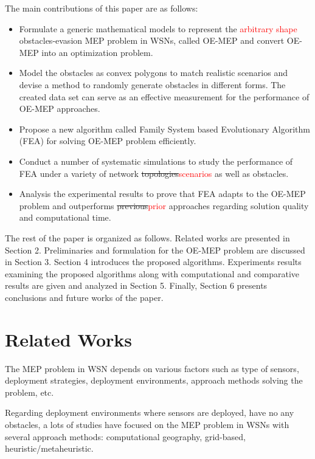\documentclass[final]{elsarticle}
\begin{document}
The main contributions of this paper are as follows:
\begin{itemize}
	\itemsep0em
	\item Formulate a generic mathematical models to represent the \textcolor{red}{arbitrary shape} obstacles-evasion MEP problem in WSNs, called OE-MEP and convert OE-MEP into an optimization problem.
	\item Model the obstacles as convex polygons to match realistic scenarios and devise a method to randomly generate obstacles in different forms. The created data set can serve as an effective measurement for the performance of OE-MEP approaches.  
	\item Propose a new algorithm called Family System based Evolutionary Algorithm (FEA) for solving OE-MEP problem efficiently. 
	\item Conduct a number of systematic simulations to study the performance of FEA under a variety of network \sout{topologies}\textcolor{red}{scenarios} as well as obstacles.
	\item Analysis the experimental results to prove that FEA adapts to the OE-MEP problem and outperforms \sout{previous}\textcolor{red}{prior} approaches regarding solution quality and computational time.	
\end{itemize}
The rest of the paper is organized as follows. Related works are presented in Section 2. Preliminaries and formulation for the OE-MEP problem are discussed in Section 3. Section 4 introduces the proposed algorithms. Experiments results examining the proposed algorithms along with computational and comparative results are given and analyzed in Section 5. Finally, Section 6 presents conclusions and future works of the paper.
\section{Related Works}
The MEP problem in WSN depends on various factors such as type of sensors, deployment strategies, deployment environments, approach methods solving the problem, etc. 

Regarding deployment environments where sensors are deployed, have no any obstacles, a lots of studies have focused on the MEP problem in WSNs with several approach methods: computational geography, grid-based, heuristic/metaheuristic.
\end{document}
